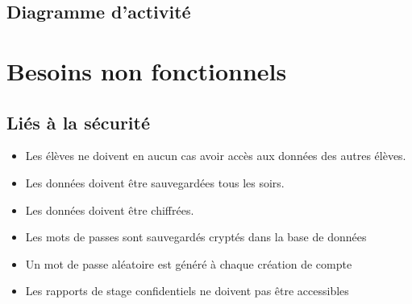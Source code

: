 \documentclass{scrreprt}
\begin{document}



\section{Diagramme d'activité}


\chapter{Besoins non fonctionnels}
\section{Li\'es \`a la s\'ecurit\'e}
\begin{itemize}
\item Les \'el\`eves ne doivent en aucun cas avoir acc\`es aux donn\'ees des autres \'el\`eves.
\item Les donn\'ees doivent \^etre sauvegard\'ees tous les soirs.
\item Les donn\'ees doivent \^etre chiffr\'ees.
\item Les mots de passes sont sauvegard\'es crypt\'es dans la base de donn\'ees
\item Un mot de passe al\'eatoire est g\'en\'er\'e \`a chaque cr\'eation de compte
\item Les rapports de stage confidentiels ne doivent pas \^etre accessibles
\end{itemize}
\end{document}
